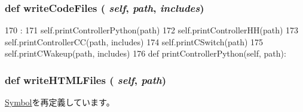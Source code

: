 \hypertarget{classslicc_1_1symbols_1_1StateMachine_1_1StateMachine_a69d0582bde832d4ff45237ab5ff116bb}{
\subsubsection[{writeCodeFiles}]{\setlength{\rightskip}{0pt plus 5cm}def writeCodeFiles ( {\em self}, \/   {\em path}, \/   {\em includes})}}
\label{classslicc_1_1symbols_1_1StateMachine_1_1StateMachine_a69d0582bde832d4ff45237ab5ff116bb}



\begin{DoxyCode}
170                                             :
171         self.printControllerPython(path)
172         self.printControllerHH(path)
173         self.printControllerCC(path, includes)
174         self.printCSwitch(path)
175         self.printCWakeup(path, includes)
176 
    def printControllerPython(self, path):
\end{DoxyCode}
\hypertarget{classslicc_1_1symbols_1_1StateMachine_1_1StateMachine_abc09a7197df5d7ef04e5cdfaa1139ead}{
\subsubsection[{writeHTMLFiles}]{\setlength{\rightskip}{0pt plus 5cm}def writeHTMLFiles ( {\em self}, \/   {\em path})}}
\label{classslicc_1_1symbols_1_1StateMachine_1_1StateMachine_abc09a7197df5d7ef04e5cdfaa1139ead}


\hyperlink{classslicc_1_1symbols_1_1Symbol_1_1Symbol_abc09a7197df5d7ef04e5cdfaa1139ead}{Symbol}を再定義しています。


